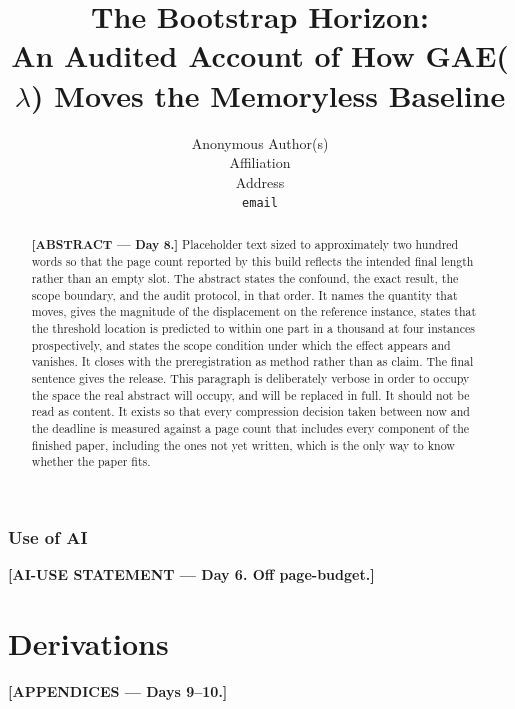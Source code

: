\documentclass{article}
\title{The Bootstrap Horizon: \\ An Audited Account of How GAE($\lambda$)
Moves the Memoryless Baseline}
\author{Anonymous Author(s) \\
Affiliation \\
Address \\
\texttt{email}}
\begin{document}
\maketitle

\begin{abstract}
\textbf{[ABSTRACT --- Day 8.]}
Placeholder text sized to approximately two hundred words so that the page
count reported by this build reflects the intended final length rather than
an empty slot. The abstract states the confound, the exact result, the scope
boundary, and the audit protocol, in that order. It names the quantity that
moves, gives the magnitude of the displacement on the reference instance,
states that the threshold location is predicted to within one part in a
thousand at four instances prospectively, and states the scope condition
under which the effect appears and vanishes. It closes with the
preregistration as method rather than as claim. The final sentence gives the
release. This paragraph is deliberately verbose in order to occupy the space
the real abstract will occupy, and will be replaced in full. It should not be
read as content. It exists so that every compression decision taken between
now and the deadline is measured against a page count that includes every
component of the finished paper, including the ones not yet written, which is
the only way to know whether the paper fits.
\end{abstract}








\subsubsection*{Use of AI}
\textbf{[AI-USE STATEMENT --- Day 6. Off page-budget.]}




\appendix


\section{Derivations}
\label{app:theory}
\textbf{[APPENDICES --- Days 9--10.]}
\end{document}
